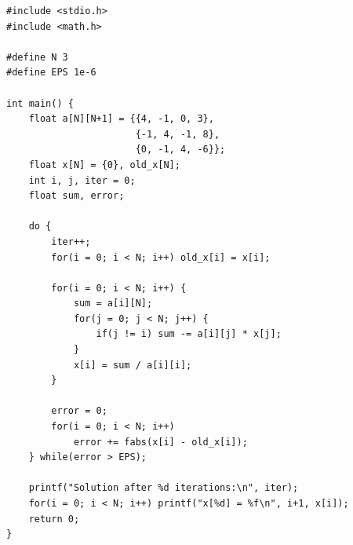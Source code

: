 \begin{verbatim}
#include <stdio.h>
#include <math.h>

#define N 3
#define EPS 1e-6

int main() {
    float a[N][N+1] = {{4, -1, 0, 3},
                       {-1, 4, -1, 8},
                       {0, -1, 4, -6}};
    float x[N] = {0}, old_x[N];
    int i, j, iter = 0;
    float sum, error;

    do {
        iter++;
        for(i = 0; i < N; i++) old_x[i] = x[i];

        for(i = 0; i < N; i++) {
            sum = a[i][N];
            for(j = 0; j < N; j++) {
                if(j != i) sum -= a[i][j] * x[j];
            }
            x[i] = sum / a[i][i];
        }

        error = 0;
        for(i = 0; i < N; i++)
            error += fabs(x[i] - old_x[i]);
    } while(error > EPS);

    printf("Solution after %d iterations:\n", iter);
    for(i = 0; i < N; i++) printf("x[%d] = %f\n", i+1, x[i]);
    return 0;
}
\end{verbatim}